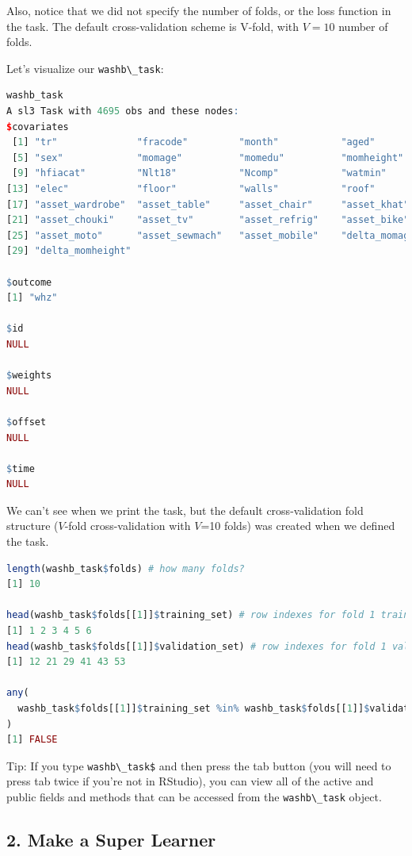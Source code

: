 \documentclass[
  12pt, krantz2,
]{book}
\newcommand{\passthrough}[1]{#1}
\theoremstyle{definition}
\theoremstyle{definition}
\theoremstyle{definition}
\newcommand{\1}{\mathbbm{1}}
\begin{document}
Also, notice that we did not specify the number of folds, or the loss function
in the task. The default cross-validation scheme is V-fold, with \(V=10\) number
of folds.

Let's visualize our \passthrough{\lstinline!washb\_task!}:

\begin{lstlisting}[language=R]
washb_task
A sl3 Task with 4695 obs and these nodes:
$covariates
 [1] "tr"              "fracode"         "month"           "aged"           
 [5] "sex"             "momage"          "momedu"          "momheight"      
 [9] "hfiacat"         "Nlt18"           "Ncomp"           "watmin"         
[13] "elec"            "floor"           "walls"           "roof"           
[17] "asset_wardrobe"  "asset_table"     "asset_chair"     "asset_khat"     
[21] "asset_chouki"    "asset_tv"        "asset_refrig"    "asset_bike"     
[25] "asset_moto"      "asset_sewmach"   "asset_mobile"    "delta_momage"   
[29] "delta_momheight"

$outcome
[1] "whz"

$id
NULL

$weights
NULL

$offset
NULL

$time
NULL
\end{lstlisting}

We can't see when we print the task, but the default cross-validation fold
structure (\(V\)-fold cross-validation with \(V\)=10 folds) was created when we
defined the task.

\begin{lstlisting}[language=R]
length(washb_task$folds) # how many folds?
[1] 10

head(washb_task$folds[[1]]$training_set) # row indexes for fold 1 training
[1] 1 2 3 4 5 6
head(washb_task$folds[[1]]$validation_set) # row indexes for fold 1 validation
[1] 12 21 29 41 43 53

any(
  washb_task$folds[[1]]$training_set %in% washb_task$folds[[1]]$validation_set
)
[1] FALSE
\end{lstlisting}

Tip: If you type \passthrough{\lstinline!washb\_task$!} and then press the tab button (you will
need to press tab twice if you're not in RStudio), you can view all of the
active and public fields and methods that can be accessed from the \passthrough{\lstinline!washb\_task!}
object.

\hypertarget{make-a-super-learner}{%
\subsection*{2. Make a Super Learner}\label{make-a-super-learner}}
\end{document}
